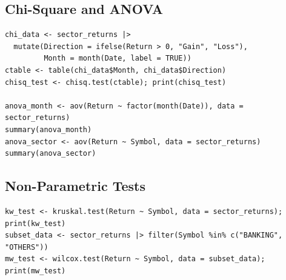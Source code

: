 \documentclass[12pt,a4paper,fleqn]{article}
\begin{document}
\subsection*{Chi-Square and ANOVA}
\begin{tcolorbox}[colback=gray!5, colframe=black!70, fontupper=\small, breakable, title=R Code]
\begin{verbatim}
chi_data <- sector_returns |>
  mutate(Direction = ifelse(Return > 0, "Gain", "Loss"),
         Month = month(Date, label = TRUE))
ctable <- table(chi_data$Month, chi_data$Direction)
chisq_test <- chisq.test(ctable); print(chisq_test)

anova_month <- aov(Return ~ factor(month(Date)), data = sector_returns)
summary(anova_month)
anova_sector <- aov(Return ~ Symbol, data = sector_returns)
summary(anova_sector)
\end{verbatim}
\end{tcolorbox}

\subsection*{Non-Parametric Tests}
\begin{tcolorbox}[colback=gray!5, colframe=black!70, fontupper=\small, breakable, title=R Code]
\begin{verbatim}
kw_test <- kruskal.test(Return ~ Symbol, data = sector_returns); print(kw_test)
subset_data <- sector_returns |> filter(Symbol %in% c("BANKING", "OTHERS"))
mw_test <- wilcox.test(Return ~ Symbol, data = subset_data); print(mw_test)
\end{verbatim}
\end{tcolorbox}
\end{document}

